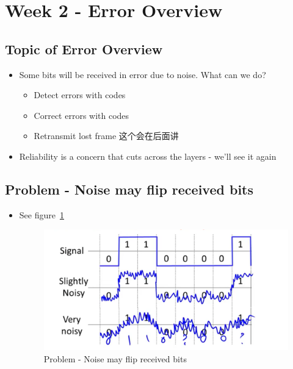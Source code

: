 \documentclass[12pt]{ctexart}   %
\begin{document}
\begin{itemize}
	\end{itemize}
	
\section{Week 2 - Error Overview}
	\subsection{Topic of Error Overview}
	\begin{itemize}
		\item Some bits will be received in error due to noise. What can we do?
		\begin{itemize}
			\item Detect errors with codes
			\item Correct errors with codes
			\item {\color{gray} Retransmit lost frame 这个会在后面讲}
		\end{itemize}
		
		\item Reliability is a concern that cuts across the layers - we'll see it again
	\end{itemize}
	
	\subsection{Problem - Noise may flip received bits}
	\begin{itemize}
		\item See figure~\ref{fig:2-8-1}
		
		 \begin{figure}[h!] %
		\centering
		 \includegraphics[scale=0.7]{images/2-8-1}
		\caption{Problem - Noise may flip received bits}
		 \label{fig:2-8-1}
		 \end{figure}	
	\end{itemize}
	
\end{document}
